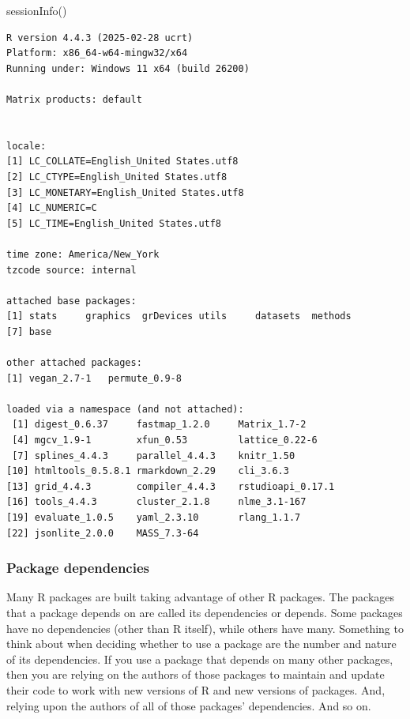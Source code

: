\documentclass[
  13,
  letterpaper,
]{report}
\newenvironment{Shaded}{\begin{snugshade}}{\end{snugshade}}
\newcommand{\FunctionTok}[1]{\textcolor[rgb]{0.28,0.35,0.67}{#1}}
\newcommand{\NormalTok}[1]{\textcolor[rgb]{0.00,0.23,0.31}{#1}}
\begin{document}
\begin{Shaded}
\begin{Highlighting}[]
\FunctionTok{sessionInfo}\NormalTok{()}
\end{Highlighting}
\end{Shaded}

\begin{verbatim}
R version 4.4.3 (2025-02-28 ucrt)
Platform: x86_64-w64-mingw32/x64
Running under: Windows 11 x64 (build 26200)

Matrix products: default


locale:
[1] LC_COLLATE=English_United States.utf8 
[2] LC_CTYPE=English_United States.utf8   
[3] LC_MONETARY=English_United States.utf8
[4] LC_NUMERIC=C                          
[5] LC_TIME=English_United States.utf8    

time zone: America/New_York
tzcode source: internal

attached base packages:
[1] stats     graphics  grDevices utils     datasets  methods  
[7] base     

other attached packages:
[1] vegan_2.7-1   permute_0.9-8

loaded via a namespace (and not attached):
 [1] digest_0.6.37     fastmap_1.2.0     Matrix_1.7-2     
 [4] mgcv_1.9-1        xfun_0.53         lattice_0.22-6   
 [7] splines_4.4.3     parallel_4.4.3    knitr_1.50       
[10] htmltools_0.5.8.1 rmarkdown_2.29    cli_3.6.3        
[13] grid_4.4.3        compiler_4.4.3    rstudioapi_0.17.1
[16] tools_4.4.3       cluster_2.1.8     nlme_3.1-167     
[19] evaluate_1.0.5    yaml_2.3.10       rlang_1.1.7      
[22] jsonlite_2.0.0    MASS_7.3-64      
\end{verbatim}

\subsubsection{Package dependencies}\label{sec-r-pack-work-dep}

Many R packages are built taking advantage of other R packages. The
packages that a package depends on are called its dependencies or
depends. Some packages have no dependencies (other than R itself), while
others have many. Something to think about when deciding whether to use
a package are the number and nature of its dependencies. If you use a
package that depends on many other packages, then you are relying on the
authors of those packages to maintain and update their code to work with
new versions of R and new versions of packages. And, relying upon the
authors of all of those packages' dependencies. And so on.
\end{document}
